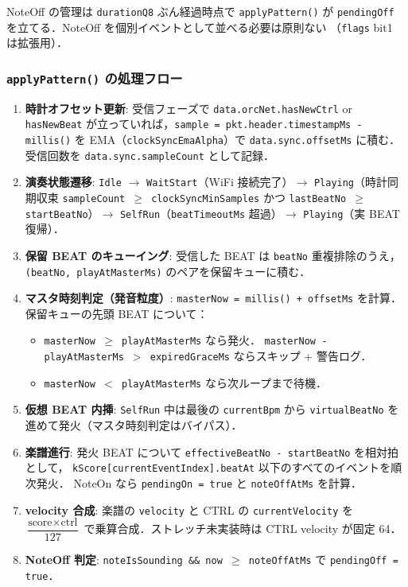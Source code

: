 \documentclass[lualatex,book,paper=a4paper,jafontsize=11.5pt,jafontscale=1.05]{jlreq}
\begin{document}
NoteOff の管理は \texttt{durationQ8} ぶん経過時点で \texttt{applyPattern()} が
\texttt{pendingOff} を立てる．NoteOff を個別イベントとして並べる必要は原則ない
（\texttt{flags} bit1 は拡張用）．

\subsubsection{\texttt{applyPattern()} の処理フロー}

\begin{enumerate}
  \item \textbf{時計オフセット更新}: 受信フェーズで \texttt{data.orcNet.hasNewCtrl} or
        \texttt{hasNewBeat} が立っていれば，\texttt{sample = pkt.header.timestampMs - millis()}
        を EMA（\texttt{clockSyncEmaAlpha}）で \texttt{data.sync.offsetMs} に積む．
        受信回数を \texttt{data.sync.sampleCount} として記録．
  \item \textbf{演奏状態遷移}: \texttt{Idle} $\to$ \texttt{WaitStart}（WiFi 接続完了）$\to$
        \texttt{Playing}（時計同期収束 \texttt{sampleCount $\geq$ clockSyncMinSamples}
        かつ \texttt{lastBeatNo $\geq$ startBeatNo}）$\to$
        \texttt{SelfRun}（\texttt{beatTimeoutMs} 超過）$\to$ \texttt{Playing}（実 BEAT 復帰）．
  \item \textbf{保留 BEAT のキューイング}: 受信した BEAT は \texttt{beatNo} 重複排除のうえ，
        \texttt{(beatNo, playAtMasterMs)} のペアを保留キューに積む．
  \item \textbf{マスタ時刻判定（発音粒度）}: \texttt{masterNow = millis() + offsetMs}
        を計算．保留キューの先頭 BEAT について：
        \begin{itemize}
          \item \texttt{masterNow $\geq$ playAtMasterMs} なら発火．
                \texttt{masterNow - playAtMasterMs $>$ expiredGraceMs} ならスキップ + 警告ログ．
          \item \texttt{masterNow $<$ playAtMasterMs} なら次ループまで待機．
        \end{itemize}
  \item \textbf{仮想 BEAT 内挿}: \texttt{SelfRun} 中は最後の \texttt{currentBpm} から
        \texttt{virtualBeatNo} を進めて発火（マスタ時刻判定はバイパス）．
  \item \textbf{楽譜進行}: 発火 BEAT について \texttt{effectiveBeatNo - startBeatNo} を相対拍として，
        \texttt{kScore[currentEventIndex].beatAt} 以下のすべてのイベントを順次発火．
        NoteOn なら \texttt{pendingOn = true} と \texttt{noteOffAtMs} を計算．
  \item \textbf{velocity 合成}: 楽譜の \texttt{velocity} と CTRL の \texttt{currentVelocity}
        を $\dfrac{\text{score} \times \text{ctrl}}{127}$ で乗算合成．ストレッチ未実装時は
        CTRL velocity が固定 64．
  \item \textbf{NoteOff 判定}: \texttt{noteIsSounding \&\& now $\geq$ noteOffAtMs} で
        \texttt{pendingOff = true}．
\end{enumerate}
\end{document}
